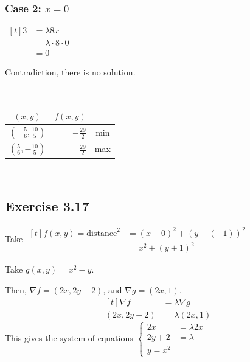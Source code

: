 \documentclass[11pt,fleqn]{book} %
\begin{document}
\subsubsection*{Case 2: $x = 0$}

$\begin{aligned}[t]
    3 & = \lambda 8 x \\
      & = \lambda \cdot 8 \cdot 0 \\
      & = 0
\end{aligned}$

Contradiction, there is no solution. 

{~~~}

\begin{center}
    \begin{tabular}{c | r c}
        $(x, y)$                      & $f(x, y)$             \\
        \hline
        \rule{0pt}{0.75cm}
        $(-\frac{5}{6},\frac{10}{5})$ & $-\frac{29}{2}$ & min \\
        \rule{0pt}{0.75cm}
        $(\frac{5}{6},-\frac{10}{5})$ & $\frac{29}{2}$  & max \\
    \end{tabular}
\end{center}

{~~~}

\subsection*{Exercise 3.17}

Take $\begin{aligned}[t]
    f(x, y) = \text{distance}^2 & = (x - 0)^2 + (y - (-1))^2 \\
                                & = x^2 + (y + 1)^2
\end{aligned}$

Take $g(x, y) = x^2 - y$. 

Then, $\nabla f = (2x, 2y +2)$, and $\nabla g = (2x, 1)$. 
$$\begin{aligned}[t]
    \nabla f   & = \lambda \nabla g \\
    (2x, 2y+2) & = \lambda(2x, 1)
\end{aligned}$$
This gives the system of equations $\begin{cases}
    2x     & = \lambda 2x \\
    2y + 2 & = \lambda    \\
    y = x^2
\end{cases}$
\end{document}
